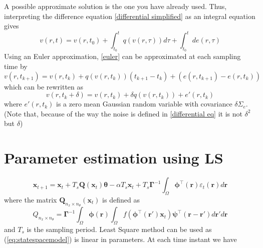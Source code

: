 \documentclass[onecolumn,draftcls]{IEEEtran}
\begin{document}
A possible approximate solution is the one you have already used. Thus, interpreting the difference equation \ref{differential simplified} as an integral equation gives
\begin{equation}\label{euler}
	v\left(r,t\right) =  v(r,t_0) + \int_{t_0}^{t} q\left(v(r,\tau) \right) d\tau  + \int_{t_0}^{t} d e\left(r,\tau\right)
\end{equation}
Using an Euler approximation, \ref{euler} can be approximated at each sampling time by
\begin{equation}\label{euler approx 1}
	v\left(r,t_{k+1} \right) =  v(r,t_k) + q\left(v(r,t_k)\right) (t_{k+1} - t_k) + (e(r,t_{k+1}) - e(r,t_k))
\end{equation}
which can be rewritten as
\begin{equation}\label{euler approx 2}
	v\left(r,t_k + \delta \right) =  v(r,t_k) + \delta q\left(v(r,t_k)\right) + e'(r,t_k)
\end{equation}
where $e'(r,t_k)$ is a zero mean Gaussian random variable with covariance $\delta\Sigma_e$. (Note that, because of the way the noise is defined in \ref{differential eq} it is not $\delta^2$ but $\delta$)

\section{Parameter estimation using LS}
\begin{equation}
 \mathbf x_{t+1}=\mathbf x_{t}+T_s \mathbf Q(\mathbf x_t)\mathbf \theta-\alpha T_s\mathbf x_t+T_s\boldsymbol\Gamma^{-1}\int_\Omega\boldsymbol\phi^\top(\mathbf r)\varepsilon_t(\mathbf r)d\mathbf r
\label{eq:statespacemodel}
\end{equation}
where the matrix $\mathbf Q_{n_x \times n_{\theta}}(\mathbf x_t)$ is defined as
\begin{equation}
 Q_{n_x \times n_{\theta}}=\boldsymbol\Gamma^{-1}\int_\Omega\boldsymbol\phi(\mathbf r)\int_\Omega f(\boldsymbol\phi^\top(\mathbf r')\mathbf x_t)\boldsymbol\psi^\top(\mathbf r-\mathbf r')d\mathbf r'd\mathbf r
\end{equation}
and $T_s$ is the sampling period. Least Square method can be used as (\ref{eq:statespacemodel}) is linear in parameters. At each time instant we have
\end{document}

